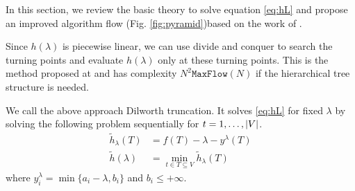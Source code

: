 \documentclass{article}
\begin{document}
In this section, we review the basic theory to solve equation \eqref{eq:hL} and propose an improved algorithm flow (Fig. \ref{fig:pyramid})based on the work of \cite{RN4}. 

Since $h(\lambda)$ is piecewise linear, we can use divide and conquer to search the turning points and evaluate $h(\lambda)$ only at these turning points. This is the method proposed at \cite{RN7} and has complexity $N^2 \mathtt{MaxFlow}(N)$ if the hierarchical tree structure is needed. 

We call the above approach Dilworth truncation. It solves \eqref{eq:hL} for fixed $\lambda$  by solving the following problem sequentially for $t=1,\dots,\lvert V\rvert$.
\begin{align}
\tilde{h}_{\lambda}(T) &= f(T) - \lambda - y^{\lambda}(T)\\
\tilde{h}(\lambda) & = \min_{t \in T \subseteq V} \tilde{h}_{\lambda}(T) \label{eq:pmq}
\end{align}
where
$y^{\lambda}_i = \min\{a_i - \lambda, b_i\}$  and $b_i \leq +\infty$. 
\end{document}
